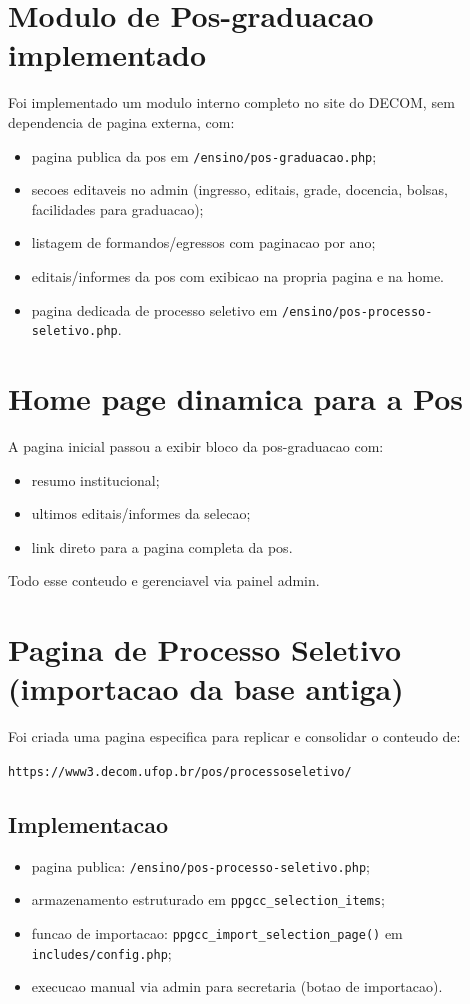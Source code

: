 \documentclass[12pt,a4paper]{article}
\begin{document}
\section{Modulo de Pos-graduacao implementado}
Foi implementado um modulo interno completo no site do DECOM, sem dependencia de pagina externa, com:
\begin{itemize}
    \item pagina publica da pos em \texttt{/ensino/pos-graduacao.php};
    \item secoes editaveis no admin (ingresso, editais, grade, docencia, bolsas, facilidades para graduacao);
    \item listagem de formandos/egressos com paginacao por ano;
    \item editais/informes da pos com exibicao na propria pagina e na home.
    \item pagina dedicada de processo seletivo em \texttt{/ensino/pos-processo-seletivo.php}.
\end{itemize}

\section{Home page dinamica para a Pos}
A pagina inicial passou a exibir bloco da pos-graduacao com:
\begin{itemize}
    \item resumo institucional;
    \item ultimos editais/informes da selecao;
    \item link direto para a pagina completa da pos.
\end{itemize}
Todo esse conteudo e gerenciavel via painel admin.

\section{Pagina de Processo Seletivo (importacao da base antiga)}
Foi criada uma pagina especifica para replicar e consolidar o conteudo de:
\begin{center}
\texttt{https://www3.decom.ufop.br/pos/processoseletivo/}
\end{center}

\subsection{Implementacao}
\begin{itemize}
    \item pagina publica: \texttt{/ensino/pos-processo-seletivo.php};
    \item armazenamento estruturado em \texttt{ppgcc\_selection\_items};
    \item funcao de importacao: \texttt{ppgcc\_import\_selection\_page()} em \texttt{includes/config.php};
    \item execucao manual via admin para secretaria (botao de importacao).
\end{itemize}
\end{document}
